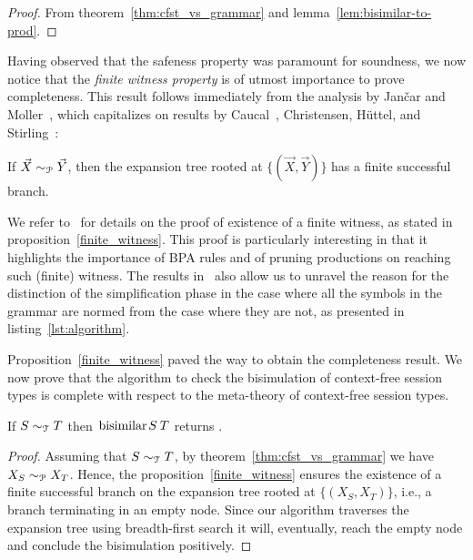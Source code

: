 \begin{proof}
  From theorem~\ref{thm:cfst_vs_grammar} and
  lemma~\ref{lem:bisimilar-to-prod}.
\end{proof}

Having observed that the safeness property was paramount for
soundness, we now notice that the \emph{finite witness property} is of
utmost importance to prove completeness. This result follows
immediately from the analysis by Jan{\v{c}}ar and
Moller~\cite{janvcar1999techniques}, which capitalizes on results by
Caucal~\cite{caucal1986decidabilite}, Christensen, H{\"{u}}ttel, and
Stirling~\cite{DBLP:journals/iandc/ChristensenHS95}:

\begin{proposition} 
\label{finite_witness}
	If $\vec X \sim_\mathcal P \vec Y$, then the expansion tree rooted at
	$\{(\vec X, \vec Y)\}$ has a finite successful branch.
\end{proposition}

We refer to~\cite{DBLP:journals/iandc/ChristensenHS95, caucal1986decidabilite}
for details on the proof of existence of a finite witness, as stated in 
proposition~\ref{finite_witness}. This proof is particularly interesting in that 
it highlights the importance of BPA rules and of pruning productions
on reaching such (finite) witness. The results 
in~\cite{DBLP:journals/iandc/ChristensenHS95, caucal1986decidabilite} 
also allow us to unravel the reason for the distinction of the 
simplification phase in the case where all the symbols in the grammar 
are normed from the case where they are not, as presented in listing~\ref{lst:algorithm}.

Proposition~\ref{finite_witness} paved the way to obtain the completeness result. 
We now prove that the algorithm to check the bisimulation of context-free session 
types is complete with respect to the meta-theory of context-free session
types.

\begin{theorem}
  If $S \sim_\mathcal T T$ then $\bisimf S T$ returns
  .
\end{theorem}

\begin{proof}
  Assuming that $S \sim_\mathcal T T$, by theorem~\ref{thm:cfst_vs_grammar}
  we have $X_{S} \sim_\mathcal P X_{T}$.  Hence, the proposition~\ref{finite_witness}
  ensures the existence of a finite successful branch on the
  expansion tree rooted at $\{(X_{S},X_{T})\}$, i.e., a branch
  terminating in an empty node.  Since our algorithm traverses the
  expansion tree using breadth-first search it will, eventually, reach
  the empty node and conclude the bisimulation positively.
\end{proof}

